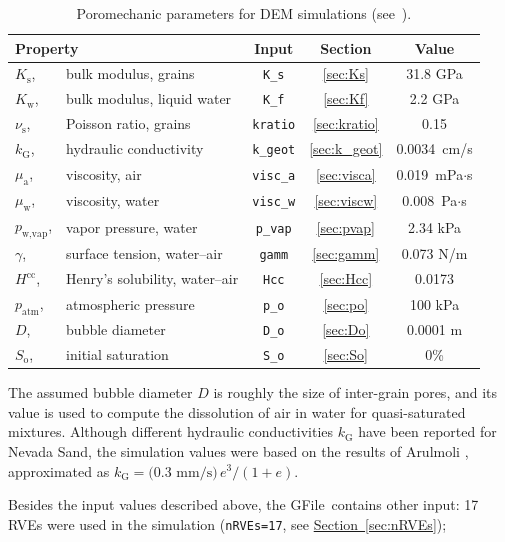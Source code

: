 \documentclass[letterpaper,11pt]{article}
\newcommand{\GFile}{\textsf{GFile}}
\begin{document}
\begin{table}
	\centering\small
	\caption{Poromechanic parameters for DEM simulations
		(see~\cite{Kuhn:2020a}).
		\label{table:poro}}
	\begin{tabular}{llccc}
		\hline
		\multicolumn{2}{l}{Property} & Input & Section &Value \\
		\hline
		$K_{\text{s}}$, & bulk modulus, grains & \texttt{K\_s} & \ref{sec:Ks} & 31.8 GPa\\
		$K_{\text{w}}$, & bulk modulus, liquid water & \texttt{K\_f} & \ref{sec:Kf} & 2.2 GPa\\
		$\nu_{\text{s}}$, & Poisson ratio, grains & \texttt{kratio} & \ref{sec:kratio} & 0.15\\
		$k_{\text{G}}$, & hydraulic conductivity & \texttt{k\_geot} & \ref{sec:k_geot} & 0.0034~cm/s\\
		$\mu_{\text{a}}$, & viscosity, air & \texttt{visc\_a} & \ref{sec:visca} & 0.019~mPa$\cdot$s\\
		$\mu_{\text{w}}$, & viscosity, water & \texttt{visc\_w} & \ref{sec:viscw} & 0.008~Pa$\cdot$s\\
		$p_{\text{w,vap}}$, & vapor pressure, water & \texttt{p\_vap} & \ref{sec:pvap} & 2.34 kPa\\
		$\gamma$, & surface tension, water--air & \texttt{gamm} & \ref{sec:gamm} & 0.073 N/m \\
		$H^{\text{cc}}$, & Henry's solubility, water--air & \texttt{Hcc} & \ref{sec:Hcc} & 0.0173 \\
		$p_{\text{atm}}$, & atmospheric pressure & \texttt{p\_o} & \ref{sec:po} & 100 kPa\\
		$D$, & bubble diameter & \texttt{D\_o} & \ref{sec:Do} & 0.0001 m \\ 
		$S_{\text{o}}$, & initial saturation & \texttt{S\_o} & \ref{sec:So} & 0\%\\
		\hline
	\end{tabular}
\end{table}
%
The assumed bubble diameter $D$ is roughly the size of inter-grain pores,
and its value is used to compute the dissolution of air in water
for quasi-saturated mixtures.
Although
different hydraulic conductivities $k_{\text{G}}$ have been reported
for Nevada Sand, the simulation values were based on the results of
Arulmoli \cite{Arulmoli1992a}, approximated
as $k_{\text{G}}= \text{(0.3 mm/s)}\,e^{3}/(1+e)$.
%
\par
Besides the input values described above,
the \GFile\ contains other input:
17 RVEs were used in the simulation
(\texttt{nRVEs=17}, see \hyperref[sec:nRVEs]{Section~\ref*{sec:nRVEs}});
\end{document}
